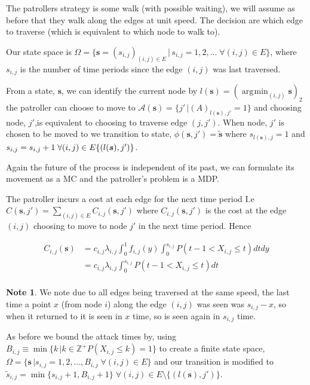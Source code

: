\documentclass[a4paper,10pt]{article}
\DeclareMathOperator*{\argmin}{\arg\!\min}
\theoremstyle{definition}
\theoremstyle{definition}
\theoremstyle{remark}
\theoremstyle{definition}
\newtheorem*{note}{Note}
\begin{document}
The patrollers strategy is some walk (with possible waiting), we will assume as before that they walk along the edges at unit speed. The decision are which edge to traverse (which is equivalent to which node to walk to).

Our state space is $\Omega= \{ \bm{s}=(s_{i,j})_{(i,j) \in E} \, | \, s_{i,j}=1,2,... \; \forall (i,j) \in E \}$, where $s_{i,j}$ is the number of time periods since the edge $(i,j)$ was last traversed.

From a state, $\bm{s}$, we can identify the current node by $l(\bm{s}) = (\argmin_{(i,j)} \bm{s})_{2} $ the patroller can choose to move to $\mathcal{A}(\bm{s})= \{ j' \, | (A)_{l(\bm{s}),j'}=1 \}$  and choosing node, $j'$,is equivalent to choosing to traverse edge $(j,j')$. When node, $j'$ is chosen to be moved to we transition to state, $\phi(\bm{s},j')=\widetilde{\bm{s}}$ where $s_{l(\bm{s}),j}=1$ and $s_{i,j}=s_{i,j}+1 \; \forall (i,j) \in E \\ \{(l(\bm{s}),j') \}$. 

Again the future of the process is independent of its past, we can formulate its  movement as a MC and the patroller's problem is a MDP.

The patroller incurs a cost at each edge for the next time period I.e $C(\bm{s},j')=\sum\limits_{(i,j) \in E} C_{i,j}(\bm{s},j')$ where $C_{i,j}(\bm{s},j')$ is the cost at the edge $(i,j)$ choosing to move to node $j'$ in the next time period. Hence

\begin{align*}
C_{i,j}(\bm{s})&= c_{i,j} \lambda_{i,j} \int_{0}^{1} f_{i,j}(y) \int_{0}^{s_{i,j}} P(t-1 < X_{i,j} \leq t) dt dy \\
&= c_{i,j} \lambda_{i,j} \int_{0}^{s_{i,j}} P(t-1 < X_{i,j} \leq t) dt \\
\end{align*}

\begin{note}
We note due to all edges being traversed at the same speed, the last time a point $x$ (from node $i$) along the edge $(i,j)$ was seen was $s_{i,j}-x$, so when it returned to it is seen in $x$ time, so is seen again in $s_{i,j}$ time.
\end{note}

As before we bound the attack times by, using $B_{i,j} \equiv \min \{ k \, | k \in \mathbb{Z}^{+} P(X_{i,j} \leq k)=1 \}$ to create a finite state space, $\Omega= \{\bm{s} \, | s_{i,j}=1,2,...,B_{i,j} \; \forall (i,j) \in E \}$ and our transition is modified to $\widetilde{s}_{i,j}=\min\{s_{i,j}+1,B_{i,j}+1 \} \; \forall (i,j) \in E \setminus \{(l(\bm{s}),j') \}$.
\end{document}
